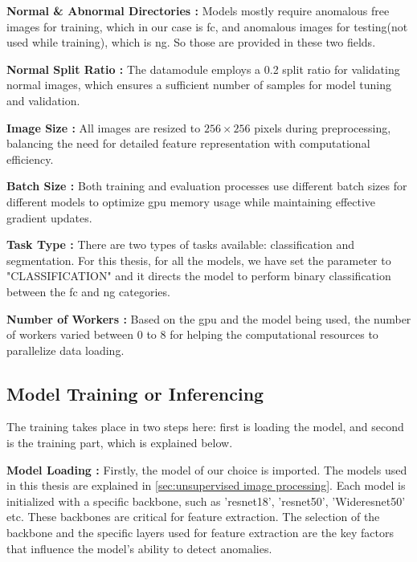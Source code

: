 \textbf{Normal \& Abnormal Directories :} Models mostly require anomalous free images for training, which in our case is \gls{fc}, and anomalous images for testing(not used while training), which is \gls{ng}. So those are provided in these two fields.

\textbf{Normal Split Ratio :} The datamodule employs a 0.2 split ratio for validating normal images, which ensures a sufficient number of samples for model tuning and validation.

\textbf{Image Size :} All images are resized to $256 \times 256$ pixels during preprocessing, balancing the need for detailed feature representation with computational efficiency.

\textbf{Batch Size :} Both training and evaluation processes use different batch sizes for different models to optimize \gls{gpu} memory usage while maintaining effective gradient updates.

\textbf{Task Type :} There are two types of tasks available: classification and segmentation. For this thesis, for all the models, we have set the parameter to "CLASSIFICATION" and it directs the model to perform binary classification between the \gls{fc} and \gls{ng} categories.

\textbf{Number of Workers :} Based on the \gls{gpu} and the model being used, the number of workers varied between 0 to 8 for helping the computational resources to parallelize data loading.


\subsection{Model Training or Inferencing}
\label{subsec:Model Training}

The training takes place in two steps here: first is loading the model, and second is the training part, which is explained below.

\textbf{Model Loading :} Firstly, the model of our choice is imported. The models used in this thesis are explained in \ref{sec:unsupervised image processing}. Each model is initialized with a specific backbone, such as '\gls{resnet}18', '\gls{resnet}50', 'Wide\gls{resnet}50' etc. These backbones are critical for feature extraction. The selection of the backbone and the specific layers used for feature extraction are the key factors that influence the model's ability to detect anomalies.

